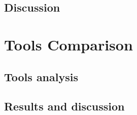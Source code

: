 \subsection{Discussion}

\section{Tools Comparison}

\subsection{Tools analysis}

\subsection{Results and discussion}


